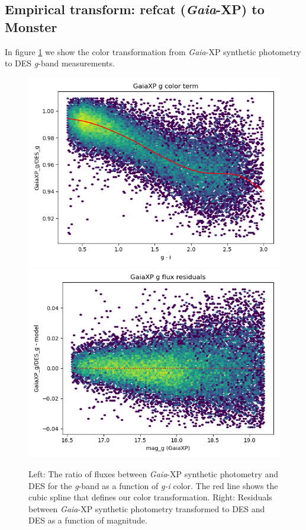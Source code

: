 \subsection{Empirical transform: refcat (\emph{Gaia}-XP) to Monster}
\label{sec:todes}
In figure \ref{fig:color-xp-g} we show the color transformation from \emph{Gaia}-XP synthetic photometry to DES \textit{g}-band measurements.
\begin{figure}
    \includegraphics[width=0.49\linewidth]{./figures/color_terms/GaiaXP_to_DES_band_g_color_term.png}
    \includegraphics[width=0.49\linewidth]{./figures/color_terms/GaiaXP_to_DES_band_g_flux_residuals.png}
    \caption{Left: The ratio of fluxes between \emph{Gaia}-XP synthetic photometry and DES for the \textit{g}-band as a function of \textit{g-i} color. The red line shows the cubic spline that defines our color transformation.
    Right: Residuals between \emph{Gaia}-XP synthetic photometry transformed to DES and DES as a function of magnitude.}
    \label{fig:color-xp-g}
\end{figure}

